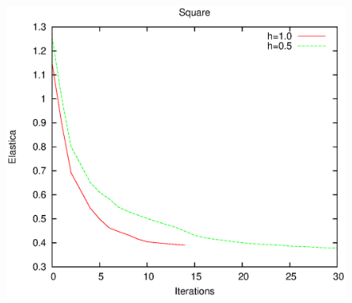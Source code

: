 \documentclass[runningheads]{llncs}
\begin{document}
		
\begin{figure}[!ht]
\center

\begin{minipage}[b]{0.5\textwidth}
\includegraphics[scale=0.3]{images/local_search/square/graph.eps}
\end{minipage}
\begin{minipage}[b]{0.45\textwidth}
\end{minipage}
\end{figure}
\end{document}
